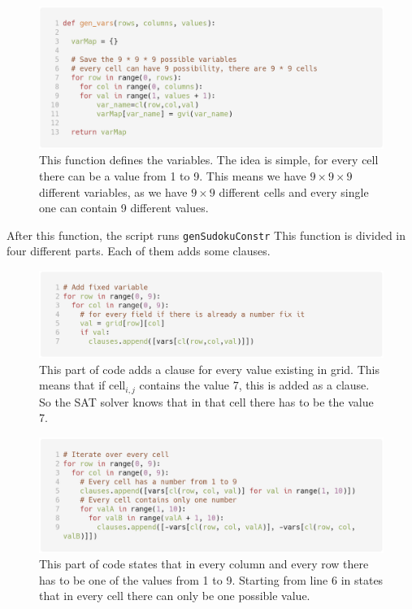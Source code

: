 \documentclass[10pt]{article}
\begin{document}
\begin{figure}[h!]
  \centering
  \includegraphics[width=\textwidth]{genVars.png}
  \caption{This function defines the variables. The idea is simple, for every
  cell there can be a value from 1 to 9. This means we have \(9 \times 9 \times 9 \) different
  variables, as we have \(9 \times 9 \) different cells and every single one
  can contain 9 different values.}
\end{figure}
\par\vspace{1cm}

After this function, the script runs \texttt{genSudokuConstr}
This function is divided in four different parts. Each of them
adds some clauses.

\begin{figure}[h!]
  \centering
  \includegraphics[width=\textwidth]{clause_01.png}
  \caption{This part of code adds a clause for every value existing
  in grid. This means that if cell\(_{i,j}\) contains the value
  7, this is added as a clause. So the SAT solver knows that in
  that cell there has to be the value 7.}
\end{figure}

\begin{figure}[h!]
  \centering
  \includegraphics[width=\textwidth]{clause_02.png}
  \caption{This part of code states that in every column and every row there has to be one of the values
  from 1 to 9. Starting from line 6 in states that in every
  cell there can only be one possible value.}
\end{figure}
\end{document}
